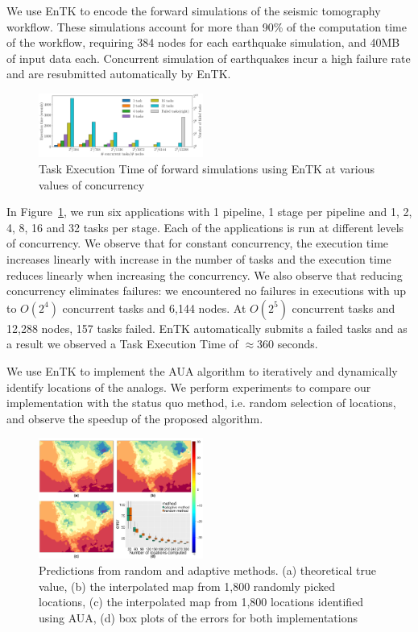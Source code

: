 We use EnTK to encode the forward simulations of the seismic tomography 
workflow. These simulations account for more than 90\% of the computation time 
of the workflow, requiring 384 nodes for each earthquake simulation, and 40MB
of input data each. Concurrent simulation of earthquakes incur a high failure 
rate and are resubmitted automatically by EnTK.

\begin{figure} 
\includegraphics[width=0.48\textwidth]{figs/specfem_exec_time_varying_concurrency_titan.pdf}
\caption{Task  Execution  Time  of  forward  simulations  using EnTK at various 
values of concurrency}\label{fig:specfem}
\end{figure}

In Figure~\ref{fig:specfem}, we run six applications with 1 pipeline, 1 stage 
per pipeline and 1, 2, 4, 8, 16 and 32 tasks per stage. Each of the applications
is run at different levels of concurrency. We observe that for constant
concurrency, the execution time increases linearly with increase in the number 
of tasks and the execution time reduces linearly when increasing the 
concurrency. We also observe that reducing concurrency eliminates failures: we 
encountered no failures in executions with up to $O(2^4)$ concurrent tasks and 
6,144 nodes. At $O(2^5)$ concurrent tasks and 12,288 nodes, 157 tasks failed. 
EnTK automatically submits a failed tasks and as a result we observed a Task 
Execution Time of \(\approx\)360 seconds.


We use EnTK to implement the AUA algorithm to iteratively and dynamically 
identify locations of the analogs. We perform experiments to compare our 
implementation with the status quo method, i.e. random selection of locations, 
and observe the speedup of the proposed algorithm.

\begin{figure} 
\includegraphics[width=0.48\textwidth]{figs/EX_PSU_error_plot_2x2.pdf}
\caption{Predictions from random and adaptive methods. (a) theoretical true 
value, (b) the interpolated map from 1,800 randomly picked locations, (c) the 
interpolated map from 1,800 locations identified using AUA, (d) box plots of the
errors for both implementations}\label{fig:anen}
\end{figure}

